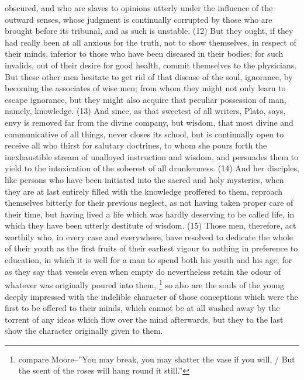obscured, and who are slaves to opinions utterly under the influence of the outward senses, whose
judgment is continually corrupted by those who are brought before its tribunal, and as such is
unstable. (12) But they ought, if they had really been at all anxious for the truth, not to show
themselves, in respect of their minds, inferior to those who have been diseased in their bodies; for
such invalids, out of their desire for good health, commit themselves to the physicians. But these
other men hesitate to get rid of that disease of the soul, ignorance, by becoming the associates of
wise men; from whom they might not only learn to escape ignorance, but they might also acquire
that peculiar possession of man, namely, knowledge. (13) And since, as that sweetest of all
writers, Plato, says, envy is removed far from the divine company, but wisdom, that most divine and
communicative of all things, never closes its school, but is continually open to receive all who thirst
for salutary doctrines, to whom she pours forth the inexhaustible stream of unalloyed instruction
and wisdom, and persuades them to yield to the intoxication of the soberest of all drunkenness.
(14) And her disciples, like persons who have been initiated into the sacred and holy mysteries,
when they are at last entirely filled with the knowledge proffered to them, reproach themselves
bitterly for their previous neglect, as not having taken proper care of their time, but having lived a
life which was hardly deserving to be called life, in which they have been utterly destitute of wisdom.
(15) Those men, therefore, act worthily who, in every case and everywhere, have resolved to
dedicate the whole of their youth as the first fruits of their earliest vigour to nothing in preference to
education, in which it is well for a man to spend both his youth and his age; for as they say that
vessels even when empty do nevertheless retain the odour of whatever was originally poured into
them, \footnote{compare Moore--''You may break, you may shatter the vase if you will, / But the scent of the roses will hang
round it still.''} so also are the souls of the young deeply impressed with the indelible character of
those conceptions which were the first to be offered to their minds, which cannot be at all washed
away by the torrent of any ideas which flow over the mind afterwards, but they to the last show the
character originally given to them.

